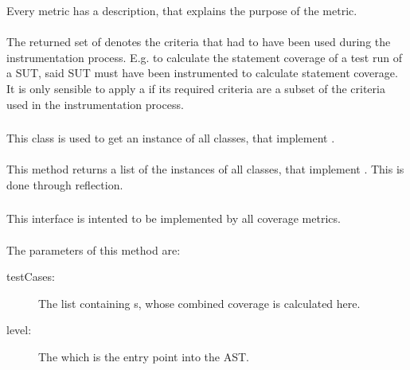 Every metric has a description, that explains the purpose of the metric.

\paragraph{} \label{Classes:Metrics:Metric:getRequiredCriteria}

The returned set of  denotes the criteria that had to have been used during the instrumentation process. E.g. to calculate the statement coverage of a test run of a SUT, said SUT must have been instrumented to calculate statement coverage. It is only sensible to apply a  if its required criteria are a subset of the criteria used in the instrumentation process.

\subsubsection{} \label{Classes:Metrics:MetricProvider}

This class is used to get an instance of all classes, that implement .

\paragraph{} \label{Classes:Metrics:MetricProvider:getAvailableMetrics}
This method returns a list of the instances of all classes, that implement . This is done through reflection.

\subsubsection{} \label{Classes:Metrics:CoverageMetric}
This interface is intented to be implemented by all coverage metrics.

\paragraph{} \label{Classes:Metrics:CoverageMetric:getCoverage_hierarchy}
The parameters of this method are:
\begin{description}
\item[testCases:] The list containing s, whose combined coverage is calculated here.

\item[level:]  The  which is the entry point into the AST.

\end{description}

